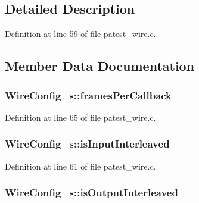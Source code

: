 \subsection{Detailed Description}


Definition at line 59 of file patest\+\_\+wire.\+c.



\subsection{Member Data Documentation}
\subsubsection[{\texorpdfstring{frames\+Per\+Callback}{framesPerCallback}}]{ Wire\+Config\+\_\+s\+::frames\+Per\+Callback}\hypertarget{struct_wire_config__s_afcf8b3765bc95ce0deb746c594bd5130}{}\label{struct_wire_config__s_afcf8b3765bc95ce0deb746c594bd5130}


Definition at line 65 of file patest\+\_\+wire.\+c.

\subsubsection[{\texorpdfstring{is\+Input\+Interleaved}{isInputInterleaved}}]{ Wire\+Config\+\_\+s\+::is\+Input\+Interleaved}\hypertarget{struct_wire_config__s_a258a6fd59147d5f22c5a2d6792a0b1d4}{}\label{struct_wire_config__s_a258a6fd59147d5f22c5a2d6792a0b1d4}


Definition at line 61 of file patest\+\_\+wire.\+c.

\subsubsection[{\texorpdfstring{is\+Output\+Interleaved}{isOutputInterleaved}}]{ Wire\+Config\+\_\+s\+::is\+Output\+Interleaved}\hypertarget{struct_wire_config__s_a41f43c21fd081159bcb8a10b3f6a0789}{}\label{struct_wire_config__s_a41f43c21fd081159bcb8a10b3f6a0789}



